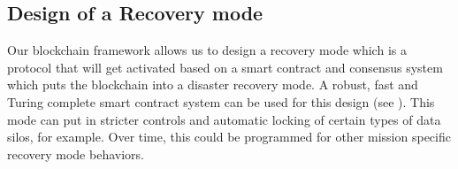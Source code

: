 \subsection{Design of a Recovery mode}

Our blockchain framework allows us to design a recovery mode which is a protocol that will get activated based on a 
smart contract and consensus system which puts the blockchain into a disaster recovery mode. A robust, fast and Turing
complete smart contract system can be used for this design (see \cite{kalodner2018}). This mode can put in 
stricter controls and automatic locking of certain types of data silos, for example. Over time, this could be programmed
for other mission specific recovery mode behaviors.
